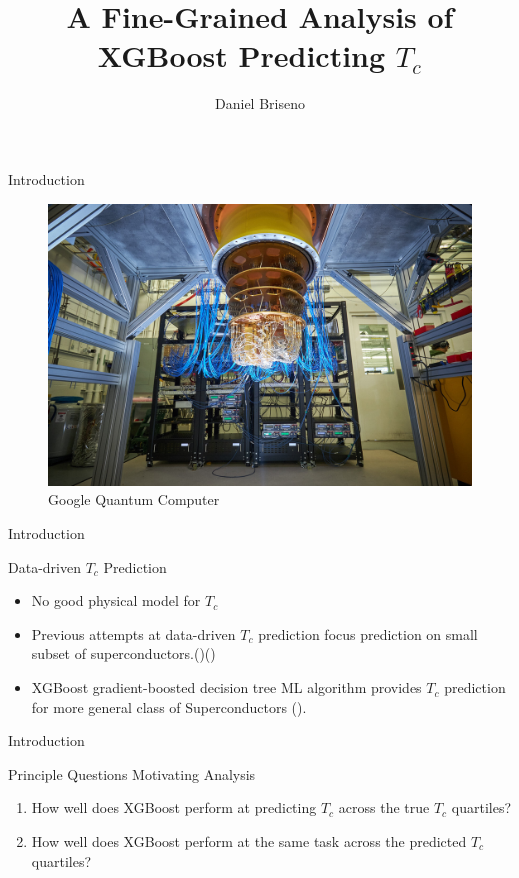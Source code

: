 \documentclass{beamer}
\title{A Fine-Grained Analysis of XGBoost Predicting $T_c$}
\author{Daniel Briseno}
\begin{document}
  \frame{\titlepage}
  
  
  
  
  \begin{frame}{Introduction}
      \begin{figure}
          \centering
          \includegraphics[width = \linewidth]{Google_qc.jpg}
          \caption{Google Quantum Computer}
          \label{fig:my_label}
      \end{figure}
  \end{frame}
  
  \begin{frame}{Introduction}
      \begin{block}{Data-driven $T_c$ Prediction}
        \begin{itemize}
            \item No good physical model for $T_c$
            \item Previous attempts at data-driven $T_c$ prediction focus prediction on small subset of superconductors.(\cite{owolabi_estimation_2015})(\cite{stanev_machine_2018})
            \item XGBoost gradient-boosted decision tree ML algorithm provides $T_c$ prediction for more general class of Superconductors (\cite{hamidieh_data-driven_2018}).
        \end{itemize}
      \end{block}
  \end{frame}
  
  \begin{frame}{Introduction}
    \begin{block}{Principle Questions Motivating Analysis}
      \begin{enumerate}
          \item How well does XGBoost perform at predicting $T_c$ across the true $T_c$ quartiles?
          \item How well does XGBoost perform at the same task across the predicted $T_c$ quartiles?
      \end{enumerate}
    \end{block}
  \end{frame}
  
\end{document}
